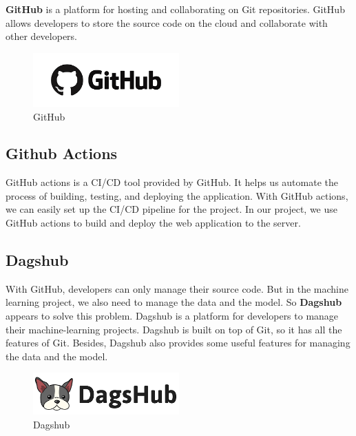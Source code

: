 \noindent \textbf{GitHub} is a platform for hosting and collaborating on Git repositories. GitHub allows developers to store the source code on the cloud and collaborate with other developers.

\begin{figure}
    \centering
    \includegraphics[width=0.5\textwidth]{Images/8.Technology_Stack/github_logo.png}
    \caption{GitHub}
    \label{fig:github}
\end{figure}

\subsection{Github Actions}
GitHub actions is a CI/CD tool provided by GitHub. It helps us automate the process of building, testing, and deploying the application. With GitHub actions, we can easily set up the CI/CD pipeline for the project. In our project, we use GitHub actions to build and deploy the web application to the server.

\subsection{Dagshub}
With GitHub, developers can only manage their source code. But in the machine learning project, we also need to manage the data and the model. So \textbf{Dagshub} appears to solve this problem.
Dagshub is a platform for developers to manage their machine-learning projects. Dagshub is built on top of Git, so it has all the features of Git. Besides, Dagshub also provides some useful features for managing the data and the model.

\begin{figure}[ht]
    \centering
    \includegraphics[width=0.5\textwidth]{Images/8.Technology_Stack/dagshub_logo.png}
    \caption{Dagshub}
    \label{fig:dagshub}
\end{figure}

